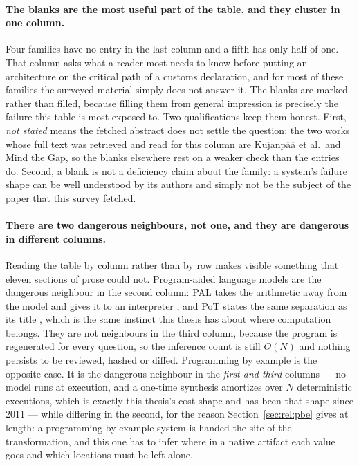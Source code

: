\paragraph{The blanks are the most useful part of the table, and they cluster in one column.}
Four families have no entry in the last column and a fifth has only half of one. That column
asks what a reader most needs to know before putting an architecture on the critical path of a
customs declaration, and for most of these families the surveyed material simply does not
answer it. The blanks are marked rather than filled, because filling them from general
impression is precisely the failure this table is most exposed to. Two qualifications keep
them honest. First, \emph{not stated} means the fetched abstract does not settle the question;
the two works whose full text was retrieved and read for this column are Kujanpää et al.\ and
Mind the Gap, so the blanks elsewhere rest on a weaker check than the entries do. Second, a
blank is not a deficiency claim about the family: a system's failure shape can be well
understood by its authors and simply not be the subject of the paper that this survey fetched.

\paragraph{There are two dangerous neighbours, not one, and they are dangerous in different
columns.}
Reading the table by column rather than by row makes visible something that eleven sections of
prose could not. Program-aided language models are the dangerous neighbour in the second
column: PAL takes the arithmetic away from the model and gives it to an interpreter
\cite{gao2023pal}, and PoT states the same separation as its title \cite{chen2023pot}, which is
the same instinct this thesis has about where computation belongs. They are not neighbours in
the third column, because the program is regenerated for every question, so the inference count
is still $O(N)$ and nothing persists to be reviewed, hashed or diffed. Programming by example
is the opposite case. It is the dangerous neighbour in the \emph{first and third} columns ---
no model runs at execution, and a one-time synthesis amortizes over $N$ deterministic
executions, which is exactly this thesis's cost shape and has been that shape since 2011
\cite{gulwani2011flashfill} --- while differing in the second, for the reason
Section~\ref{sec:rel:pbe} gives at length: a programming-by-example system is handed the site
of the transformation, and this one has to infer where in a native artifact each value goes and
which locations must be left alone.

